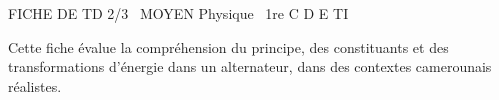 \documentclass[11pt]{article}
\begin{document}
\begin{tcolorbox}[enhanced,colback=popink,colframe=popink,arc=10pt,boxrule=0pt,left=12pt,right=12pt,top=9pt,bottom=9pt]
{\color{white}\popxbold\small FICHE DE TD 2/3 \textbullet\ MOYEN \hfill Physique \textbullet\ 1re C D E TI\par}
\end{tcolorbox}
\vspace{4pt}
Cette fiche évalue la compréhension du principe, des constituants et des transformations d'énergie dans un alternateur, dans des contextes camerounais réalistes.
\end{document}
